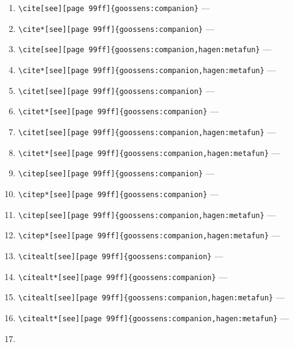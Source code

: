 \documentclass[12pt]{article}
\begin{document}
\begin{enumerate}
\item
\verb|\cite[see][page 99ff]{goossens:companion}| ---
\cite[see][page 99ff]{goossens:companion}
\item
\verb|\cite*[see][page 99ff]{goossens:companion}| ---
\cite*[see][page 99ff]{goossens:companion}
\item
\verb|\cite[see][page 99ff]{goossens:companion,hagen:metafun}| ---
\cite[see][page 99ff]{goossens:companion,hagen:metafun}
\item
\verb|\cite*[see][page 99ff]{goossens:companion,hagen:metafun}| ---
\cite*[see][page 99ff]{goossens:companion,hagen:metafun}
\item
\verb|\citet[see][page 99ff]{goossens:companion}| ---
\citet[see][page 99ff]{goossens:companion}
\item
\verb|\citet*[see][page 99ff]{goossens:companion}| ---
\citet*[see][page 99ff]{goossens:companion}
\item
\verb|\citet[see][page 99ff]{goossens:companion,hagen:metafun}| ---
\citet[see][page 99ff]{goossens:companion,hagen:metafun}
\item
\verb|\citet*[see][page 99ff]{goossens:companion,hagen:metafun}| ---
\citet*[see][page 99ff]{goossens:companion,hagen:metafun}
\item
\verb|\citep[see][page 99ff]{goossens:companion}| ---
\citep[see][page 99ff]{goossens:companion}
\item
\verb|\citep*[see][page 99ff]{goossens:companion}| ---
\citep*[see][page 99ff]{goossens:companion}
\item
\verb|\citep[see][page 99ff]{goossens:companion,hagen:metafun}| ---
\citep[see][page 99ff]{goossens:companion,hagen:metafun}
\item
\verb|\citep*[see][page 99ff]{goossens:companion,hagen:metafun}| ---
\citep*[see][page 99ff]{goossens:companion,hagen:metafun}
\item
\verb|\citealt[see][page 99ff]{goossens:companion}| ---
\citealt[see][page 99ff]{goossens:companion}
\item
\verb|\citealt*[see][page 99ff]{goossens:companion}| ---
\citealt*[see][page 99ff]{goossens:companion}
\item
\verb|\citealt[see][page 99ff]{goossens:companion,hagen:metafun}| ---
\citealt[see][page 99ff]{goossens:companion,hagen:metafun}
\item
\verb|\citealt*[see][page 99ff]{goossens:companion,hagen:metafun}| ---
\citealt*[see][page 99ff]{goossens:companion,hagen:metafun}
\item

\end{enumerate}
\end{document}
